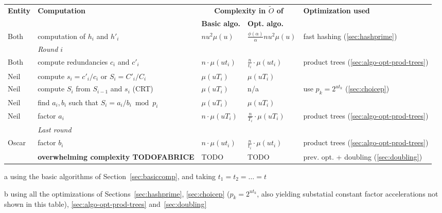 \documentclass[11pt]{llncs}
\newcommand{\Oapp}{\ensuremath{\tilde{O}}}
\begin{document}
\begin{table}[ht]
 \begin{threeparttable}
  \begin{tabularx}{\textwidth}{lXC{2cm}C{2cm}p{4.0cm}}
\toprule
{\bf \hfill Entity \hfill \null} & {\bf \hfill Computation \hfill \null} &  \multicolumn{2}{c}{{\bf Complexity in $\Oapp$ of}} & {\bf \hfill Optimization used \hfill \null} \\
\cmidrule(lr){3-4}
& & {\bf Basic algo.} & {\bf Opt. algo.} \\
\midrule
Both  & computation of $h_i$ and $h'_i$ 
      & $n u^2 \mu(u)$ 
      & $\frac{\phi(\alpha)}{\alpha} n u^2 \mu(u)$
      & fast hashing (\ref{sec:hashprime}) \\
\midrule
      & \textit{Round $i$} &  &  \\
Both  & compute redundancies $c_i$ and $c'_i$ 
      & $n \cdot \mu(ut_i)$ 
      & $\frac{n}{t_i} \cdot \mu(ut_i)$
      & product trees (\ref{sec:algo-opt-prod-trees}) \\
Neil  & compute $s_i = c'_i/c_i$ or $S_i = C'_i / C_i$
      & $\mu(uT_i)$
      & $\mu(uT_i)$
      &   \\
Neil  & compute $S_i$ from $S_{i-1}$ and $s_i$ (CRT)
      & $\mu(u T_i)$ 
      & n/a
      & use $p_k = 2^{ut_k}$ (\ref{sec:choicep}) \\
Neil  & find $a_i,b_i$ such that $S_i = a_i/b_i \bmod p_i$
      & $\mu(u T_i)$
      & $\mu(u T_i)$
      & \\
Neil  & factor $a_i$
      & $n \cdot \mu(uT_i)$ 
      & $\frac{n}{T_i} \cdot \mu(uT_i)$
      & product trees (\ref{sec:algo-opt-prod-trees})  \\
\midrule
      & \textit{Last round} \\
Oscar & factor $b_i$
      & $n \cdot \mu(ut_i)$ 
      & $\frac{n}{t_i} \cdot \mu(ut_i)$
      & product trees (\ref{sec:algo-opt-prod-trees}) \\
\midrule
      & \textbf{overwhelming complexity TODOFABRICE}
      & TODO 
      & TODO 
      & prev. opt. + doubling (\ref{sec:doubling}) \\
\bottomrule
  \end{tabularx}
  \begin{tablenotes}
    \item[a] using the basic algorithms of Section~\ref{sec:basiccomp}, and taking $t_1=t_2=\dots=t$
    \item[b] using all the optimizations of Sections~\ref{sec:hashprime}, \ref{sec:choicep} ($p_k = 2^{ut_k}$, also yielding substatial constant factor accelerations not shown in this table), \ref{sec:algo-opt-prod-trees} and~\ref{sec:doubling}

\end{tablenotes}
\end{threeparttable}
\end{table}
\end{document}
